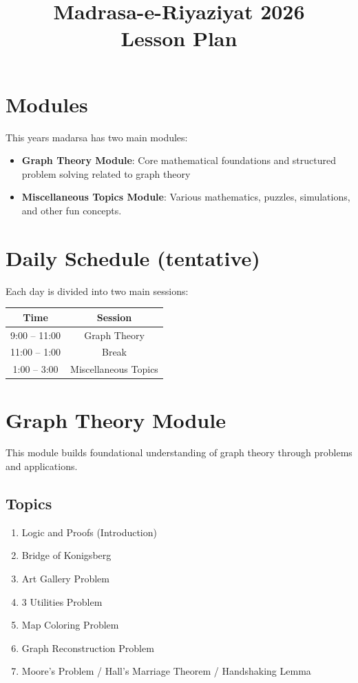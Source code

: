 \documentclass[12pt]{article}
\title{
    \textbf{Madrasa-e-Riyaziyat 2026}\\
    \large Lesson Plan
}
\author{}
\date{}
\begin{document}
\maketitle

\section{Modules}

This years madarsa has two main modules:

\begin{itemize}
    \item \textbf{Graph Theory Module}: Core mathematical foundations and structured problem solving related to graph theory
    \item \textbf{Miscellaneous Topics Module}: Various mathematics, puzzles, simulations, and other fun concepts.
\end{itemize}

\section{Daily Schedule (tentative)}

Each day is divided into two main sessions:

\begin{center}
\begin{tabular}{|c|c|}
\hline
\textbf{Time} & \textbf{Session} \\
\hline
9:00 -- 11:00 & Graph Theory \\
\hline
11:00 -- 1:00 & Break \\
\hline
1:00 -- 3:00 & Miscellaneous Topics \\
\hline
\end{tabular}
\end{center}

\section{Graph Theory Module}

This module builds foundational understanding of graph theory through problems and applications.

\subsection*{Topics}

\begin{enumerate}[label=\arabic*.]
    \item Logic and Proofs (Introduction)
    \item Bridge of Konigsberg
    \item Art Gallery Problem
    \item 3 Utilities Problem
    \item Map Coloring Problem
    \item Graph Reconstruction Problem
    \item Moore's Problem / Hall's Marriage Theorem / Handshaking Lemma
\end{enumerate}
\end{document}

